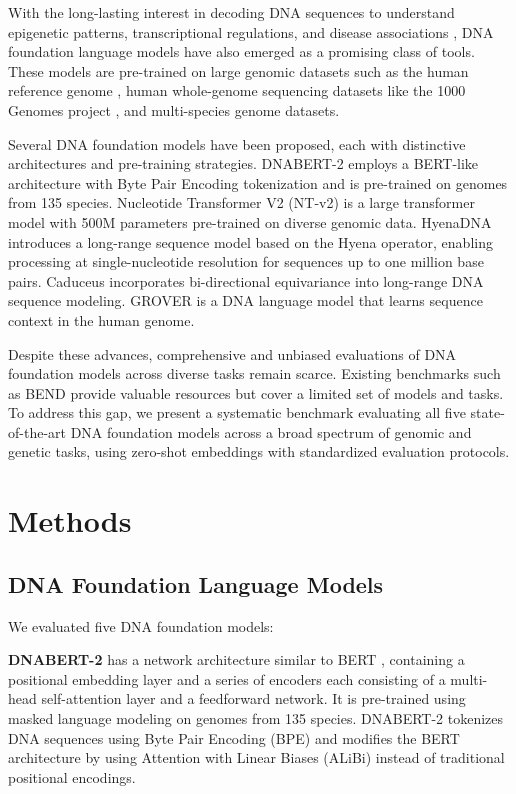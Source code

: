 \documentclass{article}
\begin{document}
With the long-lasting interest in decoding DNA sequences to understand epigenetic patterns, transcriptional regulations, and disease associations \citep{gershman2022epigenetic, avsec2021effective}, DNA foundation language models have also emerged as a promising class of tools. These models are pre-trained on large genomic datasets such as the human reference genome \citep{nurk2022complete}, human whole-genome sequencing datasets like the 1000 Genomes project \citep{byrska2022high}, and multi-species genome datasets.

Several DNA foundation models have been proposed, each with distinctive architectures and pre-training strategies. DNABERT-2 \citep{zhou2024dnabert2} employs a BERT-like architecture with Byte Pair Encoding tokenization and is pre-trained on genomes from 135 species. Nucleotide Transformer V2 (NT-v2) \citep{dallago2025nucleotide} is a large transformer model with 500M parameters pre-trained on diverse genomic data. HyenaDNA \citep{nguyen2023hyenadna} introduces a long-range sequence model based on the Hyena operator, enabling processing at single-nucleotide resolution for sequences up to one million base pairs. Caduceus \citep{schiff2024caduceus} incorporates bi-directional equivariance into long-range DNA sequence modeling. GROVER \citep{sanabria2024grover} is a DNA language model that learns sequence context in the human genome.

Despite these advances, comprehensive and unbiased evaluations of DNA foundation models across diverse tasks remain scarce. Existing benchmarks such as BEND \citep{marin2024bend} provide valuable resources but cover a limited set of models and tasks. To address this gap, we present a systematic benchmark evaluating all five state-of-the-art DNA foundation models across a broad spectrum of genomic and genetic tasks, using zero-shot embeddings with standardized evaluation protocols.

\section{Methods}

\subsection{DNA Foundation Language Models}

We evaluated five DNA foundation models:

\textbf{DNABERT-2} \citep{zhou2024dnabert2} has a network architecture similar to BERT \citep{devlin2019bert}, containing a positional embedding layer and a series of encoders each consisting of a multi-head self-attention layer and a feedforward network. It is pre-trained using masked language modeling on genomes from 135 species. DNABERT-2 tokenizes DNA sequences using Byte Pair Encoding (BPE) and modifies the BERT architecture by using Attention with Linear Biases (ALiBi) instead of traditional positional encodings.
\end{document}
